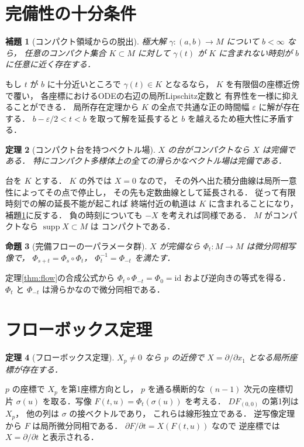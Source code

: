 \documentclass[a5paper,10pt,onecolumn]{jsarticle}
\makeatletter
\theoremstyle{mathnotetheorem}
\newtheorem{theorem}{定理}[section]
\newtheorem{lemma}[theorem]{補題}
\newtheorem{proposition}[theorem]{命題}
\renewcommand{\proofname}{証明}
\renewenvironment{proof}[1][\proofname]{%
  \par\pushQED{\qed}\normalfont\topsep4\p@\@plus2\p@\relax
  \trivlist\item[\hskip\labelsep\bfseries #1]\ignorespaces
}{\popQED\endtrivlist\@endpefalse}
\makeatother
\begin{document}
\section{完備性の十分条件}
\begin{lemma}[コンパクト領域からの脱出]\label{lem:escape}
極大解 $\gamma:(a,b)\to M$ について $b<\infty$ なら，
任意のコンパクト集合 $K\subset M$ に対して
$\gamma(t)$ が $K$ に含まれない時刻が $b$ に任意に近く存在する．
\end{lemma}
\begin{proof}
もし $t$ が $b$ に十分近いところで
$\gamma(t)\in K$ となるなら，
$K$ を有限個の座標近傍で覆い，
各座標におけるODEの右辺の局所Lipschitz定数と
有界性を一様に抑えることができる．
局所存在定理から $K$ の全点で共通な正の時間幅
$\varepsilon$ に解が存在する．
$b-\varepsilon/2<t<b$ を取って解を延長すると
$b$ を越えるため極大性に矛盾する．
\end{proof}
\begin{theorem}[コンパクト台を持つベクトル場]
$X$ の台がコンパクトなら $X$ は完備である．
特にコンパクト多様体上の全ての滑らかなベクトル場は完備である．
\end{theorem}
\begin{proof}
台を $K$ とする．
$K$ の外では $X=0$ なので，
その外へ出た積分曲線は局所一意性によってその点で停止し，
その先も定数曲線として延長される．
従って有限時刻での解の延長不能が起これば
終端付近の軌道は $K$ に含まれることになり，
補題\ref{lem:escape}に反する．
負の時刻についても $-X$ を考えれば同様である．
$M$ がコンパクトなら $\operatorname{supp}X\subset M$ は
コンパクトである．
\end{proof}
\begin{proposition}[完備フローの一パラメータ群]
$X$ が完備なら
$\Phi_t:M\to M$ は微分同相写像で，
$\Phi_{s+t}=\Phi_s\circ\Phi_t$，
$\Phi_t^{-1}=\Phi_{-t}$ を満たす．
\end{proposition}
\begin{proof}
定理\ref{thm:flow}の合成公式から
$\Phi_t\circ\Phi_{-t}=\Phi_0=\mathrm{id}$
および逆向きの等式を得る．
$\Phi_t$ と $\Phi_{-t}$ は滑らかなので微分同相である．
\end{proof}
\section{フローボックス定理}
\begin{theorem}[フローボックス定理]
$X_p\ne0$ なら $p$ の近傍で
$X=\partial/\partial x_1$ となる局所座標が存在する．
\end{theorem}
\begin{proof}
$p$ の座標で $X_p$ を第1座標方向とし，
$p$ を通る横断的な $(n-1)$ 次元の座標切片
$\sigma(u)$ を取る．写像
$F(t,u)=\Phi_t(\sigma(u))$ を考える．
$DF_{(0,0)}$ の第1列は $X_p$，
他の列は $\sigma$ の接ベクトルであり，
これらは線形独立である．
逆写像定理から $F$ は局所微分同相である．
$\partial F/\partial t=X(F(t,u))$ なので
逆座標では $X=\partial/\partial t$ と表示される．
\end{proof}
\end{document}
